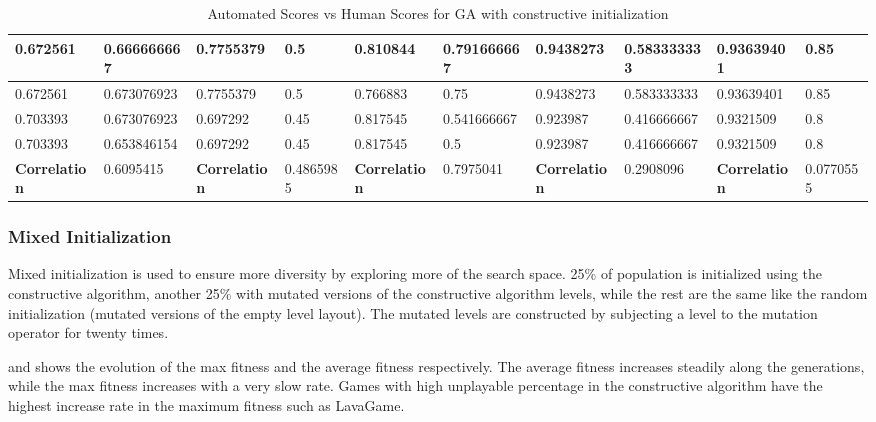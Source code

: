 \begin{landscape}
\begin{table}[!ht]
\begin{tabular}{|p{0.8in}|p{0.8in}|p{0.8in}|p{0.8in}|p{0.8in}|p{0.8in}|p{0.8in}|p{0.8in}|p{0.8in}|p{0.8in}|}
		\hline
		0.672561 & 0.666666667 & 0.7755379 & 0.5 & 0.810844 & 0.791666667 & 0.9438273 & 0.583333333 & 0.93639401 & 0.85\\
		\hline
		0.672561 & 0.673076923 & 0.7755379 & 0.5 & 0.766883 & 0.75 & 0.9438273 & 0.583333333 & 0.93639401 & 0.85\\
		\hline
		0.703393 & 0.673076923 & 0.697292 & 0.45 & 0.817545 & 0.541666667 & 0.923987 & 0.416666667 & 0.9321509 & 0.8\\
		\hline
		0.703393 & 0.653846154 & 0.697292 & 0.45 & 0.817545 & 0.5 & 0.923987 & 0.416666667 & 0.9321509 & 0.8\\
		\hline
		\textbf{Correlation} & 0.6095415 & \textbf{Correlation} & 0.4865985 & \textbf{Correlation} & 0.7975041 & \textbf{Correlation} & 0.2908096 & \textbf{Correlation} & 0.0770555\\
		\hline
	\end{tabular}
	\caption{Automated Scores vs Human Scores for GA with constructive initialization}
	\label{Table:constructiveGAScores}
\end{table}
\end{landscape}

\subsubsection{Mixed Initialization}
Mixed initialization is used to ensure more diversity by exploring more of the search space. 25\% of population is initialized using the constructive algorithm, another 25\% with mutated versions of the constructive algorithm levels, while the rest are the same like the random initialization (mutated versions of the empty level layout). The mutated levels are constructed by subjecting a level to the mutation operator for twenty times.\\\par 

 and  shows the evolution of the max fitness and the average fitness respectively. The average fitness increases steadily along the generations, while the max fitness increases with a very slow rate. Games with high unplayable percentage in the constructive algorithm have the highest increase rate in the maximum fitness such as LavaGame.



